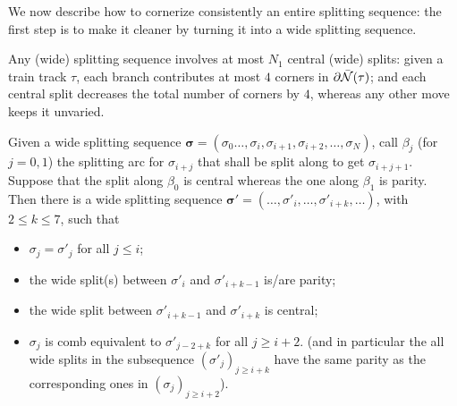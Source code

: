 We now describe how to cornerize consistently an entire splitting sequence: the first step is to make it cleaner by turning it into a wide splitting sequence.

\begin{rmk}\label{rmk:centralsplitbound}
Any (wide) splitting sequence involves at most $N_1$ central (wide) splits: given a train track $\tau$, each branch contributes at most $4$ corners in $\partial\bar{{\mathcal N}}(\tau)$; and each central split decreases the total number of corners by $4$, whereas any other move keeps it unvaried.
\end{rmk}

\begin{lemma}\label{lem:postpone}
Given a wide splitting sequence $\bm\sigma=(\sigma_0\ldots,\sigma_i,\sigma_{i+1},\sigma_{i+2},\ldots,\sigma_N)$, call $\beta_j$ (for $j=0,1$) the splitting arc for $\sigma_{i+j}$ that shall be split along to get $\sigma_{i+j+1}$. Suppose that the split along $\beta_0$ is central whereas the one along $\beta_1$ is parity. Then there is a wide splitting sequence $\bm{\sigma'}=(\ldots,\sigma'_i,\ldots,\sigma'_{i+k},\ldots)$, with $2\leq k\leq 7$, such that
\begin{itemize}
\item $\sigma_j=\sigma'_j$ for all $j\leq i$;
\item the wide split(s) between $\sigma'_i$ and $\sigma'_{i+k-1}$ is/are parity;
\item the wide split between $\sigma'_{i+k-1}$ and $\sigma'_{i+k}$ is central;
\item $\sigma_j$ is comb equivalent to $\sigma'_{j-2+k}$ for all $j\geq i+2$. (and in particular the all wide splits in the subsequence $(\sigma'_j)_{j\geq i+k}$ have the same parity as the corresponding ones in $(\sigma_j)_{j\geq i+2}$). 
\end{itemize}
\end{lemma}
